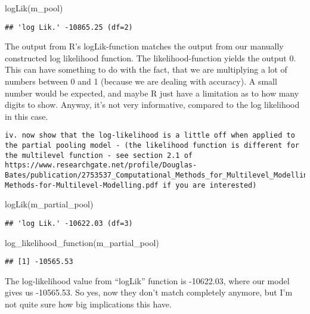 \documentclass[
]{article}
\newenvironment{Shaded}{\begin{snugshade}}{\end{snugshade}}
\newcommand{\FunctionTok}[1]{\textcolor[rgb]{0.00,0.00,0.00}{#1}}
\newcommand{\NormalTok}[1]{#1}
\begin{document}
\begin{Shaded}
\begin{Highlighting}[]
\FunctionTok{logLik}\NormalTok{(m\_pool)}
\end{Highlighting}
\end{Shaded}

\begin{verbatim}
## 'log Lik.' -10865.25 (df=2)
\end{verbatim}

The output from R's logLik-function matches the output from our manually
constructed log likelihood function. The likelihood-function yields the
output 0. This can have something to do with the fact, that we are
multiplying a lot of numbers between 0 and 1 (because we are dealing
with accuracy). A small number would be expected, and maybe R just have
a limitation as to how many digits to show. Anyway, it's not very
informative, compared to the log likelihood in this case.

\begin{verbatim}
iv. now show that the log-likelihood is a little off when applied to the partial pooling model - (the likelihood function is different for the multilevel function - see section 2.1 of https://www.researchgate.net/profile/Douglas-Bates/publication/2753537_Computational_Methods_for_Multilevel_Modelling/links/00b4953b4108d73427000000/Computational-Methods-for-Multilevel-Modelling.pdf if you are interested)
\end{verbatim}

\begin{Shaded}
\begin{Highlighting}[]
\FunctionTok{logLik}\NormalTok{(m\_partial\_pool) }
\end{Highlighting}
\end{Shaded}

\begin{verbatim}
## 'log Lik.' -10622.03 (df=3)
\end{verbatim}

\begin{Shaded}
\begin{Highlighting}[]
\FunctionTok{log\_likelihood\_function}\NormalTok{(m\_partial\_pool)}
\end{Highlighting}
\end{Shaded}

\begin{verbatim}
## [1] -10565.53
\end{verbatim}

The log-likelihood value from ``logLik'' function is -10622.03, where
our model gives us -10565.53. So yes, now they don't match completely
anymore, but I'm not quite sure how big implications this have.
\end{document}

